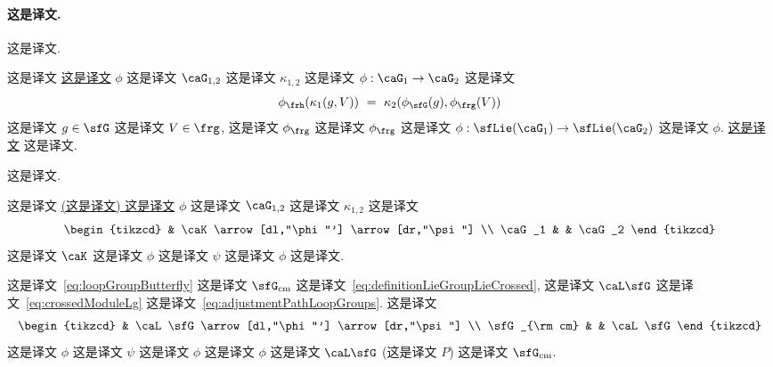 \documentclass[
    affil-it, %
    auth-lg, %
    british, %
    compression, %
    contents, %
    custom-packages={}, %
    references={bigone}, %
]{lib/preprint}
\begin{document}
\begin{body}
        \paragraph{这是译文.} 这是译文. 
        
        \begin{definition}
            这是译文 \uline{这是译文} $\phi$ 这是译文 $\caG_{1,2}$ 这是译文 $\kappa_{1,2}$ 这是译文 $\phi:\caG_1\rightarrow\caG_2$ 这是译文 
            \begin{equation}
                \phi_\frh(\kappa_1(g,V))\ =\ \kappa_2(\phi_\sfG(g),\phi_\frg(V))
            \end{equation}  这是译文 $g\in\sfG$ 这是译文 $V\in\frg$, 这是译文 $\phi_\frg$ 这是译文 $\phi_\frg$ 这是译文 $\phi:\sfLie(\caG_1)\rightarrow\sfLie(\caG_2)$ 这是译文 $\phi$. \uline{这是译文} 这是译文.
        \end{definition}
        
这是译文. 

        \begin{definition}
            这是译文 \uline{(这是译文) 这是译文} $\phi$ 这是译文 $\caG_{1,2}$ 这是译文 $\kappa_{1,2}$ 这是译文 
            \begin{equation}
                \begin{tikzcd}
                    & \caK\arrow[dl,"\phi"'] \arrow[dr,"\psi"]
                    \\
                    \caG_1 & & \caG_2
                \end{tikzcd}
            \end{equation}  这是译文 $\caK$ 这是译文 $\phi$ 这是译文 $\psi$ 这是译文 $\phi$ 这是译文.
        \end{definition}
        
        \begin{example} 
            这是译文~\eqref{eq:loopGroupButterfly} 这是译文 $\sfG_{\rm cm}$ 这是译文~\eqref{eq:definitionLieGroupLieCrossed}, 这是译文 $\caL\sfG$ 这是译文~\eqref{eq:crossedModuleLg} 这是译文~\eqref{eq:adjustmentPathLoopGroups}. 这是译文             \begin{equation}
                \begin{tikzcd}
                    & \caL\sfG \arrow[dl,"\phi"'] \arrow[dr,"\psi"]
                    \\
                    \sfG_{\rm cm} & & \caL\sfG
                \end{tikzcd}
    		\end{equation}  这是译文 $\phi$ 这是译文 $\psi$ 这是译文 $\phi$ 这是译文 $\phi$ 这是译文 $\caL\sfG$ (这是译文 $P$) 这是译文 $\sfG_{\rm cm}$.
        \end{example}
        

\end{body}
\end{document}
